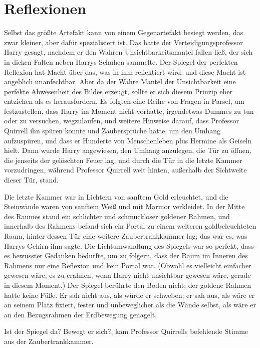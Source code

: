 \chapter{Reflexionen}

Selbst das größte Artefakt kann von einem Gegenartefakt besiegt werden, das zwar
kleiner, aber dafür spezialisiert ist. Das hatte der Verteidigungsprofessor
Harry gesagt, nachdem er den Wahren Unsichtbarkeitsmantel fallen ließ, der sich
in dicken Falten neben Harrys Schuhen sammelte. Der Spiegel der perfekten
Reflexion hat Macht über das, was in ihm reflektiert wird, und diese Macht ist
angeblich unanfechtbar. Aber da der Wahre Mantel der Unsichtbarkeit eine
perfekte Abwesenheit des Bildes erzeugt, sollte er sich diesem Prinzip eher
entziehen als es herausfordern. Es folgten eine Reihe von Fragen in Parsel, um
festzustellen, dass Harry im Moment nicht vorhatte, irgendetwas Dummes zu tun
oder zu versuchen, wegzulaufen, und weitere Hinweise darauf, dass Professor
Quirrell ihn spüren konnte und Zaubersprüche hatte, um den Umhang aufzuspüren,
und dass er Hunderte von Menschenleben plus Hermine als Geiseln hielt. Dann
wurde Harry angewiesen, den Umhang anzulegen, die Tür zu öffnen, die jenseits
der gelöschten Feuer lag, und durch die Tür in die letzte Kammer vorzudringen,
während Professor Quirrell weit hinten, außerhalb der Sichtweite dieser Tür,
stand.

Die letzte Kammer war in Lichtern von sanftem Gold erleuchtet, und die
Steinwände waren von sanftem Weiß und mit Marmor verkleidet. In der Mitte des
Raumes stand ein schlichter und schmuckloser goldener Rahmen, und innerhalb des
Rahmens befand sich ein Portal zu einem weiteren goldbeleuchteten Raum, hinter
dessen Tür eine weitere Zaubertrankkammer lag; das war es, was Harrys Gehirn ihm
sagte. Die Lichtumwandlung des Spiegels war so perfekt, dass es bewusster
Gedanken bedurfte, um zu folgern, dass der Raum im Inneren des Rahmens nur eine
Reflexion und kein Portal war. (Obwohl es vielleicht einfacher gewesen wäre, es
zu erahnen, wenn Harry nicht unsichtbar gewesen wäre, gerade in diesem Moment.)
Der Spiegel berührte den Boden nicht; der goldene Rahmen hatte keine Füße. Er
sah nicht aus, als würde er schweben; er sah aus, als wäre er an seinem Platz
fixiert, fester und unbeweglicher als die Wände selbst, als wäre er an den
Bezugsrahmen der Erdbewegung genagelt.

\glqq{}Ist der Spiegel da? Bewegt er sich?\grqq{}, kam Professor Quirrells
befehlende Stimme aus der Zaubertrankkammer.

